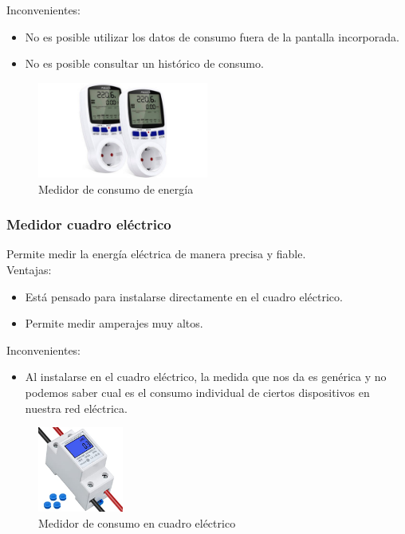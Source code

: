 \begin{titlepage}
Inconvenientes:
\begin{itemize}
	\item No es posible utilizar los datos de consumo fuera de la pantalla incorporada.
	\item No es posible consultar un histórico de consumo.
\end{itemize}
\begin{figure}[h!]
	\centering
	\includegraphics[width=0.5\textwidth]{imagenes/medidor_consumo.jpg}
	\caption{Medidor de consumo de energía\cite{medidor_img}}
\end{figure}

\subsubsection{Medidor cuadro eléctrico}
Permite medir la energía eléctrica de manera precisa y fiable.\\

Ventajas:
\begin{itemize}
	\item Está pensado para instalarse directamente en el cuadro eléctrico.
	\item Permite medir amperajes muy altos.
\end{itemize}

Inconvenientes:
\begin{itemize}
	\item Al instalarse en el cuadro eléctrico, la medida que nos da es genérica y no podemos saber cual es el consumo individual de ciertos dispositivos en nuestra red eléctrica. 
\end{itemize}
\begin{figure}[h!]
	\centering
	\includegraphics[width=0.25\textwidth]{imagenes/medidor_cuadro.jpg}
	\caption{Medidor de consumo en cuadro eléctrico\cite{medidor_cuadro_img}}
\end{figure}


\end{titlepage}
